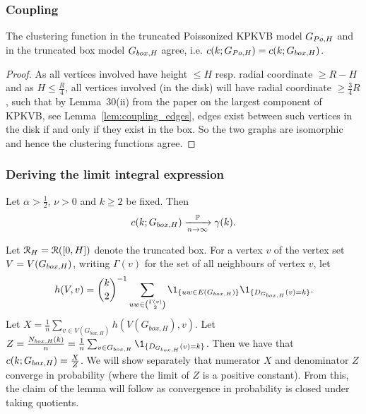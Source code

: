 \subsubsection{Coupling}
\begin{lemma}\label{lem:coup}
The clustering function in the truncated Poissonized KPKVB model $G_{Po,H}$ and in the truncated box model $G_{box,H}$ agree, i.e. $c(k;G_{Po,H}) = c(k;G_{box,H})$.
\end{lemma}
\begin{proof}
As all vertices involved have height $\leq H$ resp. radial coordinate $\geq R-H$ and as $H\leq \frac{R}{4}$, all vertices involved (in the disk)  will have radial coordinate $\geq \frac{3}{4}R$, such that by Lemma~30(ii) from the paper on the largest component of KPKVB, see Lemma~\ref{lem:coupling_edges}, edges exist between such vertices in the disk if and only if they exist in the box. So the two graphs are isomorphic and hence the clustering functions agree.
\end{proof}

\subsubsection{Deriving the limit integral expression}
\begin{lemma}\label{lem:lim}
Let $\alpha > \frac{1}{2}$, $\nu>0$ and $k\geq 2$ be fixed. Then
$$c(k;G_{box,H})\xrightarrow[n\rightarrow\infty]{\mathbb{P}}\gamma(k).$$
\end{lemma}

Let ${\mathcal R}_H = {\mathcal R}([0,H])$ denote the truncated box.
For a vertex $v$ of the vertex set $V=V(G_{box,H})$, writing $\Gamma(v)$ for the set of all neighbours of vertex $v$, let $$h(V,v) = {k \choose 2}^{-1} \sum_{uw \in {\Gamma(v) \choose 2}} \1_{\{uw \in E(\GboxH)\}} \1_{\{ D_{\GboxH}(v)=k\}}.$$
Let $X = \frac{1}{n}\sum_{v \in V(G_{box,H})} h(V(G_{box,H}),v)$. Let $Z = \frac{N_{box,H}(k)}{n} = \frac{1}{n}\sum_{v \in \GboxH} \1_{\{D_{\GboxH}(v)=k\}}$. Then we have that $c(k;G_{box,H}) = \frac{X}{Z}$. We will show separately that numerator $X$ and denominator $Z$ converge in probability (where the limit of $Z$ is a positive constant). From this, the claim of the lemma will follow as convergence in probability is closed under taking quotients.



